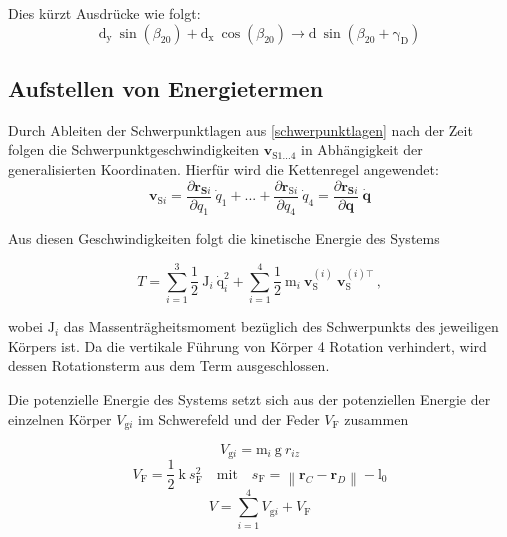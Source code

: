 \documentclass[]{scrartcl}
\begin{document}
Dies kürzt Ausdrücke wie folgt:
$$
\mathrm{d_y} ~ \sin(\beta_{20}) + \mathrm{d_x} ~ \cos(\beta_{20}) \to \mathrm{d} ~ \sin(\beta_{20} + \mathrm{\mathrm{\gamma_D}})
$$
\subsection{Aufstellen von Energietermen}
Durch Ableiten der Schwerpunktlagen aus \eqref{schwerpunktlagen} nach der Zeit folgen die Schwerpunktgeschwindigkeiten $\boldsymbol{v}_{\mathrm{S}1...4}$ in Abhängigkeit der generalisierten Koordinaten. Hierfür wird die Kettenregel angewendet:
\begin{equation}
	\mathbf{v}_{\mathrm{S}i} = \frac{\partial \mathbf{r}_{\mathbf{S}i}}{\partial q_1} ~ \dot{q}_1 + ... + \frac{\partial \mathbf{r}_{\mathrm{S}i}}{\partial q_4} ~ \dot{q}_4 = \frac{\partial \mathbf{r}_{\mathbf{S}i}}{\partial \mathbf{q}} ~ \dot{\mathbf{q}}
	\label{kettenrGeschw}
\end{equation}

Aus diesen Geschwindigkeiten folgt die kinetische Energie des Systems

\begin{equation}
T = \sum_{i=1}^{3} \frac12 ~ \mathrm{J}_i ~ \dot{\mathrm{q}}_i^2 + \sum_{i=1}^{4} \frac12 ~ \mathrm{m}_i ~ \boldsymbol{v}_{\mathrm{S}}^{(i)} ~ \boldsymbol{v}_{\mathrm{S}}^{(i)\top} \,,
\end{equation}

wobei $\mathrm{J}_i$ das Massenträgheitsmoment bezüglich des Schwerpunkts des jeweiligen Körpers ist. Da die vertikale Führung von Körper 4 Rotation verhindert, wird dessen Rotationsterm aus dem Term ausgeschlossen.

Die potenzielle Energie des Systems setzt sich aus der potenziellen Energie der einzelnen Körper $V_{\mathrm{g}i}$ im Schwerefeld und der Feder $V_{\mathrm{F}}$ zusammen

\begin{equation}
	V_{\mathrm{g}i} = \mathrm{m}_i ~ \mathrm{g} ~ r_{iz}
\end{equation}
\begin{equation}
	V_{\mathrm{F}} = \frac12 ~ \mathrm{k} ~ s_{\mathrm{F}}^2 \quad \text{mit} \quad s_{\mathrm{F}} =  \left\| \boldsymbol{r}_C - \boldsymbol{r}_D \right\| - \mathrm{l_0}
\end{equation}
\begin{equation}
	V = \sum_{i=1}^{4} V_{\mathrm{g}i} + V_{\mathrm{F}}
\end{equation}
\end{document}
